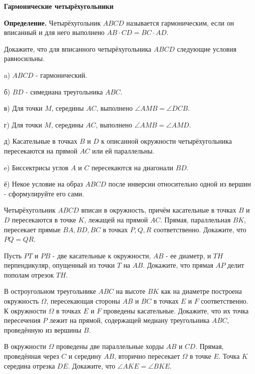 \centerline{\bf \Huge Гармонические четырёхугольники}

\textbf{Определение.}
Четырёхугольник $A B C D$ называется гармоническим, если он вписанный и для него выполнено $A B \cdot C D=B C \cdot A D$.

Докажите, что для вписанного четырёхугольника $A B C D$ следующие условия равносильны.

a) $A B C D$ - гармонический. 

б) $B D$ - симедиана треугольника $A B C$.

в) Для точки $M$, середины $A C$, выполнено $\angle A M B=\angle D C B$.

г) Для точки $M$, середины $A C$, выполнено $\angle A M B=\angle A M D$.

д) Касательные в точках $B$ и $D$ к описанной окружности четырёхугольника пересекаются на прямой $A C$ или ей параллельны.

e) Биссектрисы углов $A$ и $C$ пересекаются на диагонали $B D$.

ё) Некое условие на образ $A B C D$ после инверсии относительно одной из вершин - сформулируйте его сами.

Четырёхугольник $A B C D$ вписан в окружность, причём касательные в точках $B$ и $D$ пересекаются в точке $K$, лежащей на прямой $A C$. Прямая, параллельная $B K$, пересекает прямые $B A, B D, B C$ в точках $P, Q, R$ соответственно. Докажите, что $P Q=Q R$.

Пусть $P T$ и $P B$ - две касательные к окружности, $A B$ - ее диаметр, и $T H$ перпендикуляр, опущенный из точки $T$ на $A B$. Докажите, что прямая $A P$ делит пополам отрезок $T H$.

В остроугольном треугольнике $A B C$ на высоте $B K$ как на диаметре построена окружность $\Omega$, пересекающая стороны $A B$ и $B C$ в точках $E$ и $F$ соответственно. К окружности $\Omega$ в точках $E$ и $F$ проведены касательные. Докажите, что их точка пересечения $P$ лежит на прямой, содержащей медиану треугольника $A B C$, проведённую из вершины $B$.

В окружности $\Omega$ проведены две параллельные хорды $A B$ и $C D$. Прямая, проведённая через $C$ и середину $A B$, вторично пересекает $\Omega$ в точке $E$. Точка $K$ середина отрезка $D E$. Докажите, что $\angle A K E=\angle B K E$.

\newpage

\hspace{3mm}

